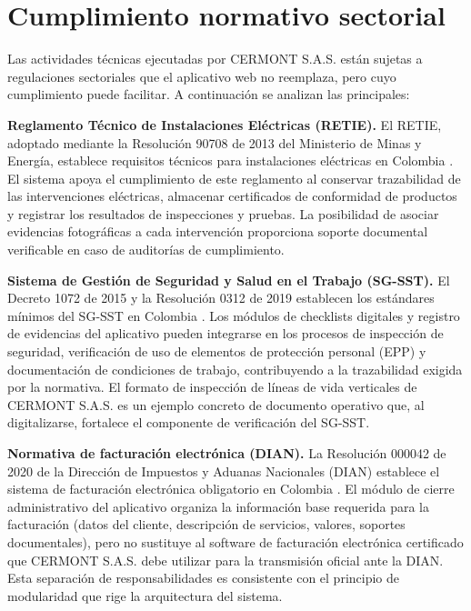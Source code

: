 \section{Cumplimiento normativo sectorial}
\label{sec:cumplimiento-sectorial}

Las actividades técnicas ejecutadas por CERMONT S.A.S. están sujetas a regulaciones sectoriales que el aplicativo web no reemplaza, pero cuyo cumplimiento puede facilitar. A continuación se analizan las principales:

\textbf{Reglamento Técnico de Instalaciones Eléctricas (RETIE).} El RETIE, adoptado mediante la Resolución 90708 de 2013 del Ministerio de Minas y Energía, establece requisitos técnicos para instalaciones eléctricas en Colombia \cite{retie2013}. El sistema apoya el cumplimiento de este reglamento al conservar trazabilidad de las intervenciones eléctricas, almacenar certificados de conformidad de productos y registrar los resultados de inspecciones y pruebas. La posibilidad de asociar evidencias fotográficas a cada intervención proporciona soporte documental verificable en caso de auditorías de cumplimiento.

\textbf{Sistema de Gestión de Seguridad y Salud en el Trabajo (SG-SST).} El Decreto 1072 de 2015 y la Resolución 0312 de 2019 establecen los estándares mínimos del SG-SST en Colombia \cite{ministerio2015,ministerio2019}. Los módulos de checklists digitales y registro de evidencias del aplicativo pueden integrarse en los procesos de inspección de seguridad, verificación de uso de elementos de protección personal (EPP) y documentación de condiciones de trabajo, contribuyendo a la trazabilidad exigida por la normativa. El formato de inspección de líneas de vida verticales de CERMONT S.A.S. \cite{formato_lineas_vida} es un ejemplo concreto de documento operativo que, al digitalizarse, fortalece el componente de verificación del SG-SST.

\textbf{Normativa de facturación electrónica (DIAN).} La Resolución 000042 de 2020 de la Dirección de Impuestos y Aduanas Nacionales (DIAN) establece el sistema de facturación electrónica obligatorio en Colombia \cite{dian2020}. El módulo de cierre administrativo del aplicativo organiza la información base requerida para la facturación (datos del cliente, descripción de servicios, valores, soportes documentales), pero no sustituye al software de facturación electrónica certificado que CERMONT S.A.S. debe utilizar para la transmisión oficial ante la DIAN. Esta separación de responsabilidades es consistente con el principio de modularidad que rige la arquitectura del sistema.


